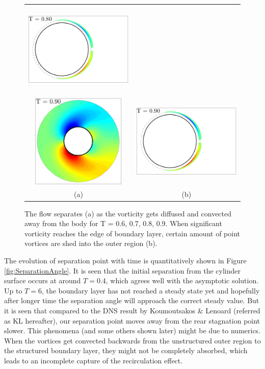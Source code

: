 \begin{figure}
\begin{center}
\begin{tabular}{cc}
 \includegraphics[height=4.5cm]{./Figures/results/static/vortices_T0_80.pdf}  \\
 \includegraphics[height=4.5cm]{./Figures/results/static/vorticity_T0_90.pdf} &
 \includegraphics[height=4.5cm]{./Figures/results/static/vortices_T0_90.pdf}  \\
 (a) & (b)
\end{tabular}
\end{center}
 \caption[Flow separation shown by vorticity development]{The flow separates (a) as the vorticity gets diffused and convected away from the body for T = 0.6, 0.7, 0.8, 0.9. When significant vorticity reaches the edge of boundary layer, certain amount of point vortices are shed into the outer region (b). }
 \label{fig:Separation2}
\end{figure}

The evolution of separation point with time is quantitatively shown in Figure \ref{fig:SeparationAngle}. 
It is seen that the initial separation from the cylinder surface occurs at around $T = 0.4$, which agrees well with the asymptotic solution.
Up to $T=6$, the boundary layer has not reached a steady state yet and hopefully after longer time the separation angle will approach the correct steady value.
But it is seen that  compared to the DNS result by Koumoutsakos \& Lenoard \cite{koumoutsakos1995high} (referred as KL hereafter), our separation point moves away from the rear stagnation point slower.
This phenomena (and some others shown later) might be due to numerics. 
When the vortices get convected backwards from the unstructured outer region to the structured boundary layer, they might not be completely absorbed, which leads to an incomplete capture of the recirculation effect. 

